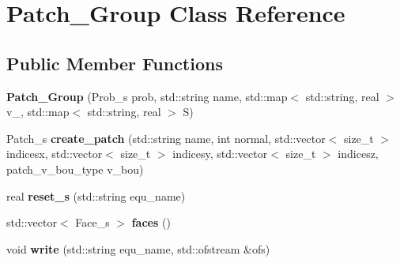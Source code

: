 \hypertarget{classPatch__Group}{
\section{Patch\_\-Group Class Reference}
\label{classPatch__Group}
}
\subsection*{Public Member Functions}
\begin{DoxyCompactItemize}
\item 
\hypertarget{classPatch__Group_a7585b36431136e14c2d17e84388969be}{
{\bfseries Patch\_\-Group} (Prob\_\-s prob, std::string name, std::map$<$ std::string, real $>$ v\_, std::map$<$ std::string, real $>$ S)}
\label{classPatch__Group_a7585b36431136e14c2d17e84388969be}

\item 
\hypertarget{classPatch__Group_abb0f6e18c5833efbe20634c1e4aabe9b}{
Patch\_\-s {\bfseries create\_\-patch} (std::string name, int normal, std::vector$<$ size\_\-t $>$ indicesx, std::vector$<$ size\_\-t $>$ indicesy, std::vector$<$ size\_\-t $>$ indicesz, patch\_\-v\_\-bou\_\-type v\_\-bou)}
\label{classPatch__Group_abb0f6e18c5833efbe20634c1e4aabe9b}

\item 
\hypertarget{classPatch__Group_ada9f56e3be9279ff5d555f2192cfc45b}{
real {\bfseries reset\_\-s} (std::string equ\_\-name)}
\label{classPatch__Group_ada9f56e3be9279ff5d555f2192cfc45b}

\item 
\hypertarget{classPatch__Group_a326628f83583bb2194f8c82548e9b6b3}{
std::vector$<$ Face\_\-s $>$ {\bfseries faces} ()}
\label{classPatch__Group_a326628f83583bb2194f8c82548e9b6b3}

\item 
\hypertarget{classPatch__Group_a3de7d3df9923795d4cbfa4d908e53598}{
void {\bfseries write} (std::string equ\_\-name, std::ofstream \&ofs)}
\label{classPatch__Group_a3de7d3df9923795d4cbfa4d908e53598}

\end{DoxyCompactItemize}
